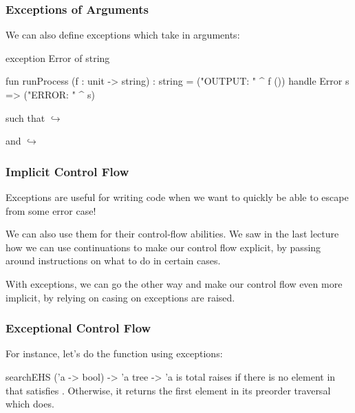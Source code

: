 \documentclass[aspectratio=169, handout]{beamer}
\begin{document}
\begin{frame}[fragile]
  \frametitle{Exceptions of Arguments}

  We can also define exceptions which take in arguments:
  \begin{codeblock}
    exception Error of string

    fun runProcess (f : unit -> string) : string =
      ("OUTPUT: " ^ f ())
      handle Error s => ("ERROR: " ^ s)
  \end{codeblock}

  \pause
  \vspace{\fill}

  such that
   $\hookrightarrow$ 

  \pause
  \vspace{\fill}

  and
   $\hookrightarrow$ 
\end{frame}


\begin{frame}[fragile]
  \frametitle{Implicit Control Flow}

  Exceptions are useful for writing code when we want to quickly be able to escape
  from some error case!

  \pause
  \vspace{\fill}

  We can also use them for their control-flow abilities. We saw in the last lecture
  how we can use continuations to make our control flow explicit, by passing
  around instructions on what to do in certain cases.

  \pause
  \vspace{\fill}

  With exceptions, we can go the other way and make our control flow even more implicit,
  by relying on casing on exceptions are raised.
\end{frame}

\begin{frame}[fragile]
  \frametitle{Exceptional Control Flow}

  For instance, let's do the  function using exceptions:

  \pause
  \spec
    {searchEHS}
    {('a -> bool) -> 'a tree -> 'a}
    { is total}
    { raises  if there is no element in
     that satisfies . Otherwise, it returns the first element
    in its preorder traversal which does.}
\end{frame}
\end{document}
